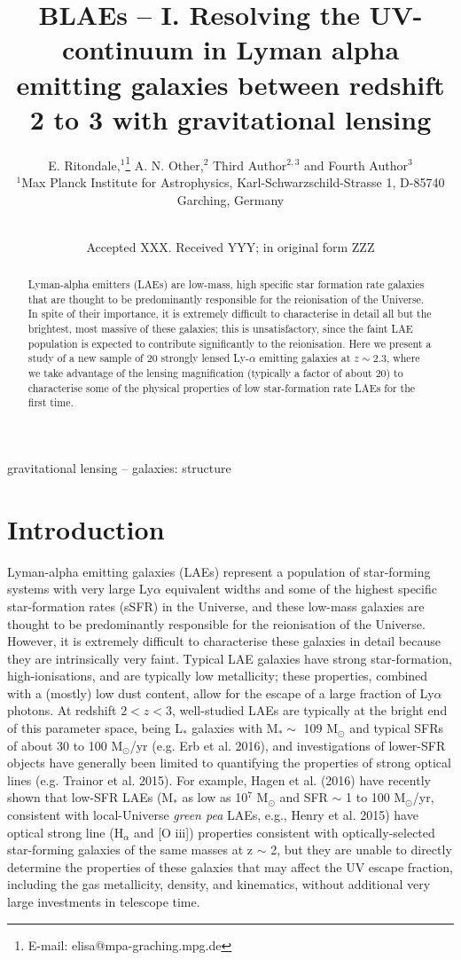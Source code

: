 \documentclass[a4paper,fleqn,usenatbib]{mnras}
\title[BLAEs -- I.]{BLAEs -- I. Resolving the UV-continuum in Lyman alpha emitting galaxies between redshift 2 to 3 with gravitational lensing}
\author[E. Ritondale et al.]{
E. Ritondale,$^{1}$\thanks{E-mail: elisa@mpa-graching.mpg.de}
A. N. Other,$^{2}$
Third Author$^{2,3}$
and Fourth Author$^{3}$
\\
$^{1}$Max Planck Institute for Astrophysics, Karl-Schwarzschild-Strasse 1, D-85740 Garching, Germany\\\\
}
\date{Accepted XXX. Received YYY; in original form ZZZ}
\begin{document}
\label{firstpage}
\pagerange{\pageref{firstpage}--\pageref{lastpage}}
\maketitle

\label{firstpage}

\begin{abstract}
Lyman-alpha emitters (LAEs) are low-mass, high specific star formation rate galaxies that are thought to be predominantly responsible for the reionisation of the Universe. In spite of their importance, it is extremely difficult to characterise in detail all but the brightest, most massive of these galaxies; this is unsatisfactory, since the faint LAE population is expected to contribute significantly to the reionisation. Here we present a study of a new sample of 20 strongly lensed Ly-$\alpha$ emitting galaxies at $z \sim 2.3$, where we take advantage of the lensing magnification (typically a factor of  about 20) to characterise some of the physical properties of low star-formation rate LAEs for the first time.

\end{abstract}
\begin{keywords}
gravitational lensing -- galaxies: structure 
\end{keywords}



\section{Introduction}
Lyman-alpha emitting galaxies (LAEs) represent a population of star-forming systems with very large Ly$\alpha$ equivalent widths and some of the highest specific star-formation rates (sSFR) in the Universe, and these low-mass galaxies are thought to be predominantly responsible for the reionisation of the Universe. However, it is extremely difficult to characterise these galaxies in detail because they are intrinsically very faint. Typical LAE galaxies have strong star-formation, high-ionisations, and are typically low metallicity; these properties, combined with a (mostly) low dust content, allow for the escape of a large fraction of Ly$\alpha$ photons. At redshift  $2 < z < 3$, well-studied LAEs are typically at the bright end of this parameter space, being  L$_\text{*}$ galaxies with M$_\text{*} \sim$ 109 M$_\odot$ and typical SFRs of about 30 to 100 M$_\odot$/yr (e.g. Erb et al. 2016), and investigations of lower-SFR objects have generally been limited to quantifying the properties of strong optical lines (e.g. Trainor et al. 2015). For example, Hagen et al. (2016) have recently shown that low-SFR LAEs (M$_\text{*}$ as low as 10$^7$ M$_\odot$ and SFR $\sim$ 1 to 100 M$_\odot$/yr, consistent with local-Universe \emph{green pea} LAEs, e.g., Henry et al. 2015) have optical strong line (H$_\alpha$ and [O iii]) properties consistent with optically-selected star-forming galaxies of the same masses at z $\sim$ 2, but they are unable to directly determine the properties of these galaxies that may affect the UV escape fraction, including the gas metallicity, density, and kinematics, without additional very large investments in telescope time.
\end{document}
